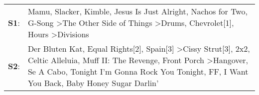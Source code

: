 \begin{supertabular}{p{0.03\textwidth}p{0.92\textwidth}}
 \textbf{S1}:  &                                                                                                                                                            Mamu\textsuperscript{}, \enspace Slacker\textsuperscript{}, \enspace Kimble\textsuperscript{}, \enspace Jesus Is Just Alright\textsuperscript{}, \enspace Nachos for Two\textsuperscript{}, \enspace G-Song\textsuperscript{} \textgreater \enspace The Other Side of Things\textsuperscript{} \textgreater \enspace Drums\textsuperscript{}, \enspace Chevrolet[1]\textsuperscript{}, \enspace Hours\textsuperscript{} \textgreater \enspace Divisions\textsuperscript{}  \enspace  \\
 \textbf{S2}:  &  Der Bluten Kat\textsuperscript{}, \enspace Equal Rights[2]\textsuperscript{}, \enspace Spain[3]\textsuperscript{} \textgreater \enspace Cissy Strut[3]\textsuperscript{}, \enspace 2x2\textsuperscript{}, \enspace Celtic Alleluia\textsuperscript{}, \enspace Muff II: The Revenge\textsuperscript{}, \enspace Front Porch\textsuperscript{} \textgreater \enspace Hangover\textsuperscript{}, \enspace Se A Cabo\textsuperscript{}, \enspace Tonight I'm Gonna Rock You Tonight\textsuperscript{}, \enspace FF\textsuperscript{}, \enspace I Want You Back\textsuperscript{}, \enspace Baby Honey Sugar Darlin'\textsuperscript{}  \enspace  \\
\end{supertabular}
